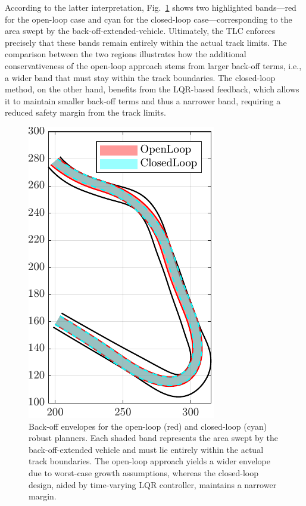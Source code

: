 According to the latter interpretation, Fig.~\ref{fig:olcl_traj_bands} shows two highlighted bands---red for the open-loop case and cyan for the closed-loop case---corresponding to the area swept by the back-off-extended-vehicle. Ultimately, the TLC enforces precisely that these bands remain entirely within the actual track limits. The comparison between the two regions illustrates how the additional conservativeness of the open-loop approach stems from larger back-off terms, i.e., a wider band that must stay within the track boundaries. The closed-loop method, on the other hand, benefits from the LQR-based feedback, which allows it to maintain smaller back-off terms and thus a narrower band, requiring a reduced safety margin from the track limits.
\begin{figure}
	\centering
	\includegraphics{Fig/olcl_traj_bands.pdf}
	\caption{Back-off envelopes for the open-loop (red) and closed-loop (cyan) robust planners. Each shaded band represents the area swept by the back-off-extended vehicle and must lie entirely within the actual track boundaries.
The open-loop approach yields a wider envelope due to worst-case growth assumptions, whereas the closed-loop design, aided by time-varying LQR controller, maintains a narrower margin.}
	\label{fig:olcl_traj_bands}
\end{figure}


